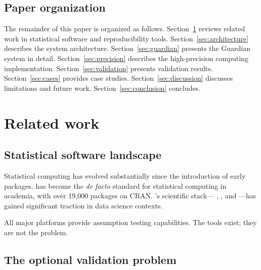 \documentclass[article]{jss}
\begin{document}
\subsection{Paper organization}

The remainder of this paper is organized as follows. Section~\ref{sec:related} reviews related work in statistical software and reproducibility tools. Section~\ref{sec:architecture} describes the system architecture. Section~\ref{sec:guardian} presents the Guardian system in detail. Section~\ref{sec:precision} describes the high-precision computing implementation. Section~\ref{sec:validation} presents validation results. Section~\ref{sec:cases} provides case studies. Section~\ref{sec:discussion} discusses limitations and future work. Section~\ref{sec:conclusion} concludes.


\section{Related work} \label{sec:related}


\subsection{Statistical software landscape}

Statistical computing has evolved substantially since the introduction of early packages.  \citep{rcore2023} has become the \emph{de facto} standard for statistical computing in academia, with over 19,000 packages on CRAN. 's scientific stack--- \citep{harris2020numpy},  \citep{virtanen2020scipy}, and  \citep{seabold2010statsmodels}---has gained significant traction in data science contexts.

All major platforms provide assumption testing capabilities. The tools exist; they are not the problem.

\subsection{The optional validation problem}
\end{document}
